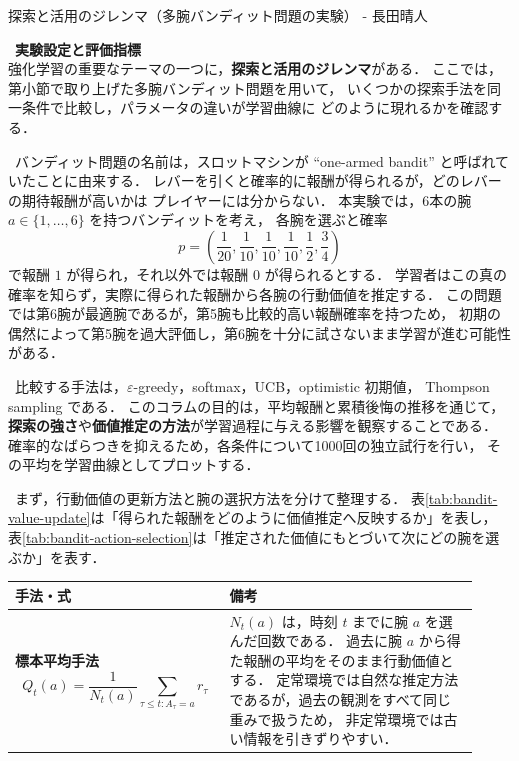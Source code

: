 \clearpage
\begin{column}{探索と活用のジレンマ（多腕バンディット問題の実験） - 長田晴人}

\ \textbf{実験設定と評価指標}\\
強化学習の重要なテーマの一つに，\textbf{探索と活用のジレンマ}がある．
ここでは，第小節で取り上げた多腕バンディット問題を用いて，
いくつかの探索手法を同一条件で比較し，パラメータの違いが学習曲線に
どのように現れるかを確認する．

\ バンディット問題の名前は，スロットマシンが ``one-armed bandit''
と呼ばれていたことに由来する．
レバーを引くと確率的に報酬が得られるが，どのレバーの期待報酬が高いかは
プレイヤーには分からない．
本実験では，6本の腕 $a\in\{1,\ldots,6\}$ を持つバンディットを考え，
各腕を選ぶと確率
\[
    p=\left(\frac{1}{20},\frac{1}{10},\frac{1}{10},\frac{1}{10},\frac{1}{2},\frac{3}{4}\right)
\]
で報酬 $1$ が得られ，それ以外では報酬 $0$ が得られるとする．
学習者はこの真の確率を知らず，実際に得られた報酬から各腕の行動価値を推定する．
この問題では第6腕が最適腕であるが，第5腕も比較的高い報酬確率を持つため，
初期の偶然によって第5腕を過大評価し，第6腕を十分に試さないまま学習が進む可能性がある．

\ 比較する手法は，$\varepsilon$-greedy，softmax，UCB，optimistic 初期値，
Thompson sampling である．
このコラムの目的は，平均報酬と累積後悔の推移を通じて，
\textbf{探索の強さ}や\textbf{価値推定の方法}が学習過程に与える影響を観察することである．
確率的なばらつきを抑えるため，各条件について1000回の独立試行を行い，
その平均を学習曲線としてプロットする．

\ まず，行動価値の更新方法と腕の選択方法を分けて整理する．
表\ref{tab:bandit-value-update}は「得られた報酬をどのように価値推定へ反映するか」を表し，
表\ref{tab:bandit-action-selection}は「推定された価値にもとづいて次にどの腕を選ぶか」を表す．

\begin{center}
    \small
    \renewcommand{\arraystretch}{1.55}
    \label{tab:bandit-value-update}
    \begin{tabular}{p{0.42\linewidth}p{0.50\linewidth}}
      \toprule
      手法・式 & 備考 \\
      \midrule

      \textbf{標本平均手法}
      \[
      Q_t(a)
      =
      \frac{1}{N_t(a)}
      \sum_{\tau \leq t: A_\tau=a} r_\tau
      \]
      &
      $N_t(a)$ は，時刻 $t$ までに腕 $a$ を選んだ回数である．
      過去に腕 $a$ から得た報酬の平均をそのまま行動価値とする．
      定常環境では自然な推定方法であるが，過去の観測をすべて同じ重みで扱うため，
      非定常環境では古い情報を引きずりやすい．
      \\


\end{tabular}
\end{center}
\end{column}
